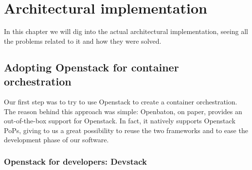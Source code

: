 \chapter{Architectural implementation}
\label{chap:archimpl}
 
In this chapter we will dig into the actual architectural implementation, 
seeing all the problems related to it and how they were solved.

\section{Adopting Openstack for container orchestration}

Our first step was to try to use Openstack to create a container orchestration. 
The reason behind this approach was simple: Openbaton, on paper, provides an 
out-of-the-box support for Openstack. In fact, it natively supports Openstack 
PoPs, giving to us a great possibility to reuse the two frameworks and to ease 
the development phase of our software.
\subsection{Openstack for developers: Devstack}
